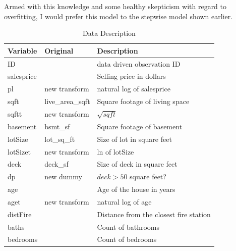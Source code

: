 \documentclass[twocolumn,11pt]{article}
\begin{document}
Armed with this knowledge and some healthy skepticism with regard to overfitting,
I would prefer this model to the stepwise model shown earlier.


\onecolumn





\pagebreak


\pagebreak
\begin{table}[scale=0.4]
\caption{Data Description}
\label{tab:data}
\centering
\begin{tabular}{lll}
\hline
Variable   & Original           & Description \\
\hline
ID         &                    & data driven observation ID \\
salesprice &                    & Selling price in dollars \\
pl         & new transform      & natural log of salesprice \\
\hline
sqft       & live\_area\_sqft   & Square footage of living space \\
sqftt      & new transform      & $\sqrt{sqft}$ \\
basement   & bsmt\_sf           & Square footage of basement \\
lotSize    & lot\_sq\_ft        & Size of lot in square feet \\
lotSizet   & new transform      & ln of lotSize \\
deck       & deck\_sf           & Size of deck in square feet \\
dp         & new dummy          & $deck > 50$ square feet? \\
\hline
age        &                    & Age of the house in years \\
aget       & new transform      & natural log of age \\
distFire   &                    & Distance from the closest fire station \\
\hline
baths      &                    & Count of bathrooms \\
bedrooms   &                    & Count of bedrooms \\

\end{tabular}
\end{table}
\end{document}
